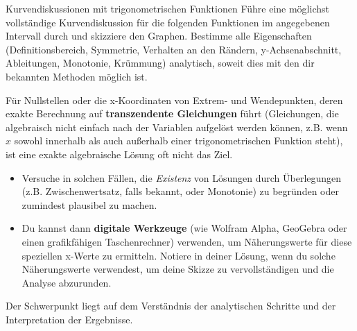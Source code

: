 \begin{aufgabenumgebung}{Kurvendiskussionen mit trigonometrischen Funktionen}
Führe eine möglichst vollständige Kurvendiskussion für die folgenden Funktionen im angegebenen Intervall durch und skizziere den Graphen. Bestimme alle Eigenschaften (Definitionsbereich, Symmetrie, Verhalten an den Rändern, y-Achsenabschnitt, Ableitungen, Monotonie, Krümmung) analytisch, soweit dies mit den dir bekannten Methoden möglich ist. 

Für Nullstellen oder die x-Koordinaten von Extrem- und Wendepunkten, deren exakte Berechnung auf \textbf{transzendente Gleichungen} führt (Gleichungen, die algebraisch nicht einfach nach der Variablen aufgelöst werden können, z.B. wenn $x$ sowohl innerhalb als auch außerhalb einer trigonometrischen Funktion steht), ist eine exakte algebraische Lösung oft nicht das Ziel.
\begin{itemize}
    \item Versuche in solchen Fällen, die \textit{Existenz} von Lösungen durch Überlegungen (z.B. Zwischenwertsatz, falls bekannt, oder Monotonie) zu begründen oder zumindest plausibel zu machen.
    \item Du kannst dann \textbf{digitale Werkzeuge} (wie Wolfram Alpha, GeoGebra oder einen grafikfähigen Taschenrechner) verwenden, um Näherungswerte für diese speziellen x-Werte zu ermitteln. Notiere in deiner Lösung, wenn du solche Näherungswerte verwendest, um deine Skizze zu vervollständigen und die Analyse abzurunden.
\end{itemize}
Der Schwerpunkt liegt auf dem Verständnis der analytischen Schritte und der Interpretation der Ergebnisse.


\end{aufgabenumgebung}
